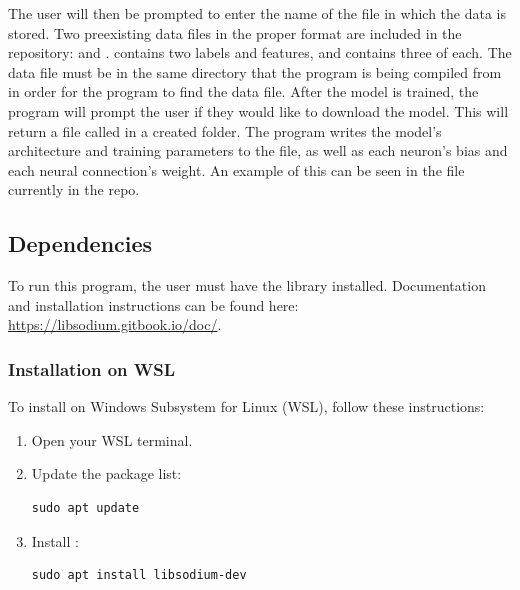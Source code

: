 \documentclass[12pt]{article}
\begin{document}
 The user will then be prompted to enter the name of the file in which the data is stored. Two preexisting data files in the proper format are included in the repository:  and .  contains two labels and features, and  contains three of each. The data file must be in the same directory that the program is being compiled from in order for the program to find the data file. After the model is trained, the program will prompt the user if they would like to download the model. This will return a file called  in a created folder. The program writes the model’s architecture and training parameters to the file, as well as each neuron’s bias and each neural connection’s weight. An example of this can be seen in the  file currently in the repo.

\subsection{Dependencies}

To run this program, the user must have the  library installed. Documentation and installation instructions can be found here: \url{https://libsodium.gitbook.io/doc/}. 

\subsubsection{ Installation on WSL}

To install  on Windows Subsystem for Linux (WSL), follow these instructions:

\begin{enumerate}
    \item Open your WSL terminal.
    \item Update the package list:
 	\begin{mdframed}[style=myboxstyleTerminal1]
		\begin{verbatim}
sudo apt update
		\end{verbatim}
	\end{mdframed}
    \item Install :
 	\begin{mdframed}[style=myboxstyleTerminal1]
		\begin{verbatim}
sudo apt install libsodium-dev
		\end{verbatim}
	\end{mdframed}
\end{enumerate}
\end{document}
